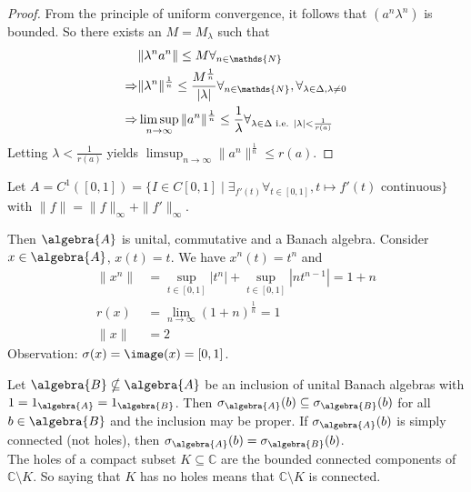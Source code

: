 \documentclass[a4paper]{article}
\begin{document}
\begin{proof}
	From the principle of uniform convergence, it follows that $(a^n \lambda^n)$ is bounded. So there exists an $M = M_\lambda$ such that
	\begin{align*}
		      & \|\lambda^n a^n\| \leq M \forall_{n \in \mathds{N}}                                                                                           \\
		\then & \| \lambda^n \|^{\frac{1}{n}} \leq \frac{M^{\frac{1}{n}}}{|\lambda|} \forall_{n \in \mathds{N}}, \forall_{\lambda \in \Delta, \lambda \neq 0} \\
		\then & \limsup_{n \to \infty} \|a^n\|^{\frac{1}{n}} \leq \frac{1}{\lambda} \forall_{\lambda \in \Delta \text{ i.e. } |\lambda| < \frac{1}{r(a)}}
	\end{align*}
	Letting $\lambda < \frac{1}{r(a)}$ yields $\limsup_{n \to \infty} \|a^n\|^{\frac{1}{n}} \leq r(a)$.
\end{proof}

\begin{example}
	Let $A = C^1([0,1]) = \{ I \in C[0,1] \mid \exists_{f'(t)} \forall_{t \in [0,1]}, t \mapsto f'(t) \text{ continuous} \}$ with $\|f\| = \|f\|_\infty + \|f'\|_\infty$.

	Then $\algebra{A}$ is unital, commutative and a Banach algebra. Consider $x \in \algebra{A}$, $x(t) = t$. We have $x^n(t) = t^n$ and
	\begin{align*}
		\|x^n\| & = \sup_{t \in [0,1]} |t^n| + \sup_{t \in [0,1]} |n t^{n-1}| = 1 + n \\
		r(x)  & = \lim_{n \to \infty} (1+n)^\frac{1}{n} = 1                         \\
		\| x \| & = 2
	\end{align*}
	Observation: $\sigma(x) = \image(x) = [0,1]$.
\end{example}

\begin{theorem}
	Let $\algebra{B} \nsubseteq \algebra{A}$ be an inclusion of unital Banach algebras with $1 = 1_\algebra{A} = 1_\algebra{B}$. Then $\sigma_\algebra{A}(b) \subseteq \sigma_\algebra{B}(b)$ for all $b \in \algebra{B}$ and the inclusion may be proper. If $\sigma_\algebra{A}(b)$ is simply connected (not holes), then $\sigma_\algebra{A}(b) = \sigma_\algebra{B}(b)$.\\
	The holes of a compact subset $K \subseteq \mathds{C}$ are the bounded connected components of $\mathds{C} \setminus K$. So saying that $K$ has no holes means that $\mathds{C} \setminus K$ is connected.
\end{theorem}
\end{document}
